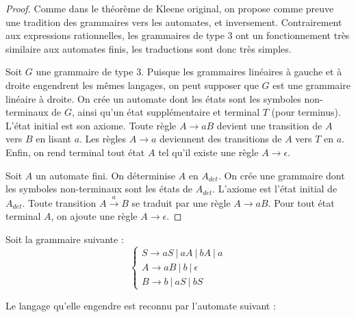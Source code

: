 \begin{proof}
Comme dans le théorème de Kleene original, on propose comme preuve une tradition des grammaires vers les automates, et inversement. Contrairement aux expressions rationnelles, les grammaires de type 3 ont un fonctionnement très similaire aux automates finis, les traductions sont donc très simples.

Soit $G$ une grammaire de type 3. Puisque les grammaires linéaires à gauche et à droite engendrent les mêmes langages, on peut supposer que $G$ est une grammaire linéaire à droite. On crée un automate dont les états sont les symboles non-terminaux de $G$, ainsi qu'un état supplémentaire et terminal $T$ (pour terminus). L'état initial est son axiome. Toute règle $A \rightarrow aB$ devient une transition de $A$ vers $B$ en lisant $a$. Les règles $A \rightarrow a$ deviennent des transitions de $A$ vers $T$ en $a$. Enfin, on rend terminal tout état $A$ tel qu'il existe une règle $A \rightarrow \epsilon$.

Soit $A$ un automate fini. On déterminise $A$ en $A_{det}$. On crée une grammaire dont les symboles non-terminaux sont les états de $A_{det}$. L'axiome est l'état initial de $A_{det}$. Toute transition $A \xrightarrow{a} B$ se traduit par une règle $A \rightarrow aB $. Pour tout état terminal $A$, on ajoute une règle $A \rightarrow \epsilon$.
\end{proof}

\begin{example}
Soit la grammaire suivante :
\[
\begin{cases}
S \rightarrow aS~|~aA~|~bA~|~a \\
A \rightarrow aB~|~b~|~\epsilon \\
B \rightarrow b~|~aS~|~bS 
\end{cases}
\]

Le langage qu'elle engendre est reconnu par l'automate suivant :


\begin{figure}[!ht]
\centering
{}
\end{figure}

\end{example}

